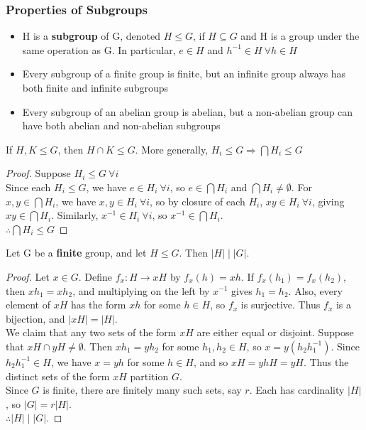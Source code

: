 \documentclass[../Odyssey_Project.tex]{subfiles}
\begin{document}
\subsubsection*{Properties of Subgroups}
\begin{itemize}
    \item H is a \textbf{subgroup} of G, denoted \(H \leq G\), if \(H\subseteq G\) and H is a group under the same operation as G. In particular, \(e \in H\) and \(h^{-1} \in H \ \forall h \in H\)
    \item Every subgroup of a finite group is finite, but an infinite group always has both finite and infinite subgroups
    \item Every subgroup of an abelian group is abelian, but a non-abelian group can have both abelian and non-abelian subgroups
\end{itemize}
\begin{proposition}
\label{prop:1.1}
If \(H,K \leq G\), then $H \cap K \leq G$. More generally, \(H_i\leq G \Rightarrow \bigcap H_i \leq G\)
\end{proposition}
\begin{proof}
    Suppose \(H_i \leq G \ \forall i\) \\
    Since each \(H_i \leq G\), we have \(e \in H_i \ \forall i\), so \(e \in \bigcap H_i\) and \(\bigcap H_i \neq \emptyset\). For \(x, y \in \bigcap H_i\), we have \(x, y \in H_i \ \forall i\), so by closure of each \(H_i\), \(xy \in H_i \ \forall i\), giving \(xy \in \bigcap H_i\). Similarly, \(x^{-1} \in H_i \ \forall i\), so \(x^{-1} \in \bigcap H_i\). \\
    \(\therefore \bigcap H_i \leq G\)
\end{proof}
\begin{namedtheorem}
\label{thm:lagrange}
Let G be a \textbf{finite} group, and let $H \leq G$. Then $|H| \mid |G|$.
\end{namedtheorem}
\begin{proof}
    Let \(x \in G\). Define \(f_x \colon H \to xH\) by \(f_x(h) = xh\). If \(f_x(h_1) = f_x(h_2)\), then \(xh_1 = xh_2\), and multiplying on the left by \(x^{-1}\) gives \(h_1 = h_2\). Also, every element of \(xH\) has the form \(xh\) for some \(h \in H\), so \(f_x\) is surjective. Thus \(f_x\) is a bijection, and \(|xH| = |H|\). \\
    We claim that any two sets of the form \(xH\) are either equal or disjoint. Suppose that \(xH \cap yH \neq \emptyset\). Then \(xh_1 = yh_2\) for some \(h_1, h_2 \in H\), so \(x = y(h_2h_1^{-1})\). Since \(h_2h_1^{-1} \in H\), we have \(x = yh\) for some \(h \in H\), and so \(xH = yhH = yH\). Thus the distinct sets of the form \(xH\) partition \(G\). \\
    Since \(G\) is finite, there are finitely many such sets, say \(r\). Each has cardinality \(|H|\), so \(|G| = r|H|\).  \\
    \(\therefore |H| \mid |G|\).
\end{proof}
\end{document}
